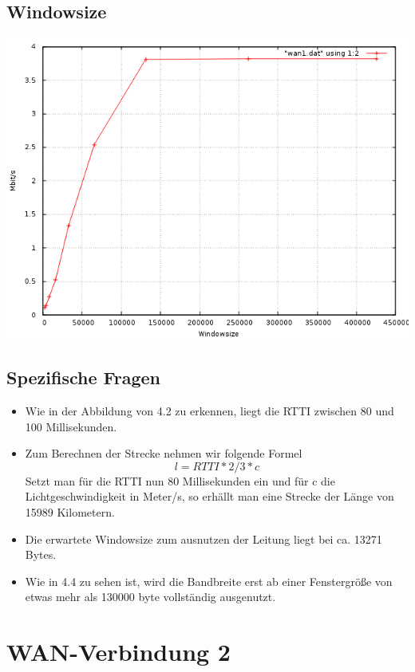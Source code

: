 \documentclass[a4paper,10pt]{article}
\begin{document}
\subsection{Windowsize}
\includegraphics[scale=0.75]{wan1_windows.png}

\subsection{Spezifische Fragen}
\begin{itemize}
 \item Wie in der Abbildung von 4.2 zu erkennen, liegt die RTTI zwischen 80 und 100 Millisekunden.
 \item {Zum Berechnen der Strecke nehmen wir folgende Formel
 \begin{equation}
  l=RTTI*2/3*c
 \end{equation}
 Setzt man für die RTTI nun 80 Millisekunden ein und für c die Lichtgeschwindigkeit in Meter/s,
 so erhällt man eine Strecke der Länge von 15989 Kilometern.}
 \item Die erwartete Windowsize zum ausnutzen der Leitung liegt bei ca. 13271 Bytes.
 \item Wie in 4.4 zu sehen ist, wird die Bandbreite erst ab einer Fenstergröße von etwas mehr als 130000 byte vollständig ausgenutzt.
\end{itemize}

\section{WAN-Verbindung 2}
\end{document}
